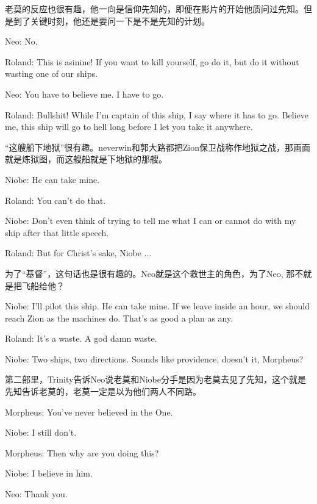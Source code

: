 \documentclass[UTF8]{ctexart}
\newenvironment{myquote}{\color{green} \setlength{\leftskip}{6em} \setlength{\rightskip}{4em} \setlength{\parindent}{-2em}}{\par}
\begin{document}
老莫的反应也很有趣，他一向是信仰先知的，即便在影片的开始他质问过先知。但是到了关键时刻，他还是要问一下是不是先知的计划。

\begin{myquote}
Neo: No.

Roland: This is asinine! If you want to kill yourself, go do it, but do it without wasting one of our ships.

Neo: You have to believe me. I have to go.

Roland: Bullshit! While I'm captain of this ship, I say where it has to go. Believe me, this ship will go to hell long before I let you take it anywhere.
\end{myquote}

“这艘船下地狱”很有趣。neverwin和郭大路都把Zion保卫战称作地狱之战，那画面就是炼狱图，而这艘船就是下地狱的那艘。

\begin{myquote}
Niobe: He can take mine.

Roland: You can't do that.

Niobe: Don't even think of trying to tell me what I can or cannot do with my ship after that little speech.

Roland: But for Christ's sake, Niobe ...
\end{myquote}

为了“基督”，这句话也是很有趣的。Neo就是这个救世主的角色，为了Neo, 那不就是把飞船给他？

\begin{myquote}
Niobe: I'll pilot this ship. He can take mine. If we leave inside an hour, we should reach Zion as the machines do. That's as good a plan as any.

Roland: It's a waste. A god damn waste.

Niobe: Two ships, two directions. Sounds like providence, doesn't it, Morpheus?
\end{myquote}

第二部里，Trinity告诉Neo说老莫和Niobe分手是因为老莫去见了先知，这个就是先知告诉老莫的，老莫一定是以为他们两人不同路。

\begin{myquote}
Morpheus: You've never believed in the One.

Niobe: I still don't.

Morpheus: Then why are you doing this?

Niobe: I believe in him.

Neo: Thank you.
\end{myquote}
\end{document}
